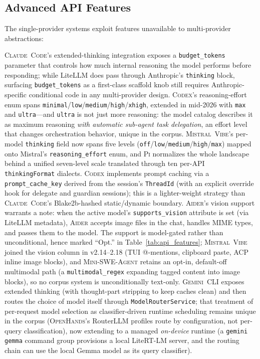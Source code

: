 \documentclass[11pt,a4paper]{article}
\newcommand{\clcode}{\textsc{Claude~Code}\xspace}
\newcommand{\cdx}{\textsc{Codex}\xspace}
\newcommand{\oh}{\textsc{OpenHands}\xspace}
\newcommand{\adr}{\textsc{Aider}\xspace}
\newcommand{\mswe}{\textsc{Mini-SWE-Agent}\xspace}
\newcommand{\vibe}{\textsc{Mistral~Vibe}\xspace}
\newcommand{\gemini}{\textsc{Gemini~CLI}\xspace}
\newcommand{\pib}{\textsc{Pi}\xspace}
\begin{document}
\subsection{Advanced API Features}

The single-provider systems exploit features unavailable to multi-provider abstractions:

\clcode{}'s extended-thinking integration exposes a \texttt{budget\_tokens} parameter that controls how much internal reasoning the model performs before responding; while LiteLLM does pass through Anthropic's \texttt{thinking} block, surfacing \texttt{budget\_tokens} as a first-class scaffold knob still requires Anthropic-specific conditional code in any multi-provider design.
\cdx{}'s reasoning-effort enum spans \texttt{minimal}/\texttt{low}/\texttt{medium}/\texttt{high}/\texttt{xhigh}, extended in mid-2026 with \texttt{max} and \texttt{ultra}---and \texttt{ultra} is not just more reasoning: the model catalog describes it as maximum reasoning \emph{with automatic sub-agent task delegation}, an effort level that changes orchestration behavior, unique in the corpus.
\vibe{}'s per-model \texttt{thinking} field now spans five levels (\texttt{off}/\texttt{low}/\texttt{medium}/\texttt{high}/\texttt{max}) mapped onto Mistral's \texttt{reasoning\_effort} enum, and \pib{} normalizes the whole landscape behind a unified seven-level scale translated through ten per-API \texttt{thinkingFormat} dialects.
\cdx{} implements prompt caching via a \texttt{prompt\_cache\_key} derived from the session's \texttt{ThreadId} (with an explicit override hook for delegate and guardian sessions); this is a lighter-weight strategy than \clcode{}'s Blake2b-hashed static/dynamic boundary.
\adr{}'s vision support warrants a note: when the active model's \texttt{supports\_vision} attribute is set (via LiteLLM metadata), \adr{} accepts image files in the chat, handles MIME types, and passes them to the model.
The support is model-gated rather than unconditional, hence marked ``Opt.'' in Table~\ref{tab:api_features}; \vibe{} joined the vision column in v2.14--2.18 (TUI @-mentions, clipboard paste, ACP inline image blocks), and \mswe{} retains an opt-in, default-off multimodal path (a \texttt{multimodal\_regex} expanding tagged content into image blocks), so no corpus system is unconditionally text-only.
\gemini{} exposes extended thinking (with thought-part stripping to keep caches clean) and then routes the choice of model itself through \texttt{ModelRouterService}; that treatment of per-request model selection as classifier-driven runtime scheduling remains unique in the corpus (\oh{}'s RouterLLM profiles route by configuration, not per-query classification), now extending to a managed \emph{on-device} runtime (a \texttt{gemini gemma} command group provisions a local LiteRT-LM server, and the routing chain can use the local Gemma model as its query classifier).
\end{document}
